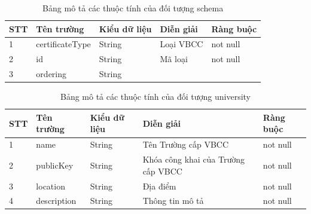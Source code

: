 \begin{enumerate}
\begin{table}[H]
\caption{Bảng mô tả các thuộc tính của đối tượng schema}
	\label{table:assetschema}
	\begin{tabularx} {\textwidth} {|p{1cm}|p{3cm}|p{3cm}|X|p{2cm}|}
\hline
		STT &	Tên trường & Kiểu dữ liệu & Diễn giải & Ràng buộc \\ \hline
		1 & certificateType	& String & Loại VBCC  & not null \\ \hline
		2 & id  & String  & Mã loại  & not null \\ \hline
		3 & ordering	&  String &   & \\ \hline
	\end{tabularx}
\end{table}


\begin{table}[H]
\caption{Bảng mô tả các thuộc tính của đối tượng university}
	\label{table:assetuniversity}
	\begin{tabularx} {\textwidth} {|p{1cm}|p{3cm}|p{3cm}|X|p{2cm}|}
\hline
		STT &	Tên trường & Kiểu dữ liệu & Diễn giải & Ràng buộc \\ \hline
		1 & name	& String & Tên Trường cấp VBCC  & not null \\ \hline
		2 & publicKey & String  & Khóa công khai của Trường cấp VBCC  & not null \\ \hline
		3 & location	&  String & Địa điểm  &not null \\ \hline
		4 & description	& String & Thông tin mô tả  &not null \\ \hline
\end{tabularx}
\end{table}

\end{enumerate}
